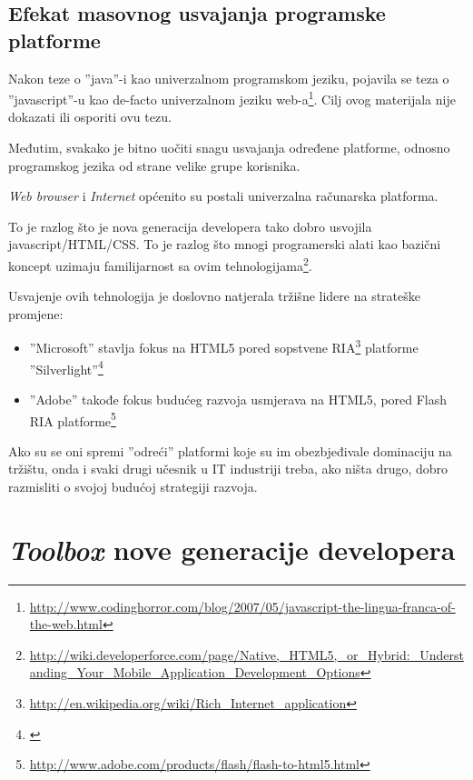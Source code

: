 \documentclass[times, utf8, seminar]{fit}
\begin{document}
\section{Efekat masovnog usvajanja programske platforme}

Nakon teze o ''java''-i kao univerzalnom programskom jeziku, pojavila se teza o ''javascript''-u kao de-facto univerzalnom jeziku web-a\footnote{\url{http://www.codinghorror.com/blog/2007/05/javascript-the-lingua-franca-of-the-web.html}}. Cilj ovog materijala nije dokazati ili osporiti ovu tezu.

Međutim, svakako je bitno uočiti snagu usvajanja određene platforme, odnosno programskog jezika od strane velike grupe korisnika. 

\emph{Web browser} i \emph{Internet} općenito su postali univerzalna računarska platforma. 

To je razlog što je nova generacija developera tako dobro usvojila javascript/HTML/CSS. To je razlog što mnogi programerski alati kao bazični koncept uzimaju familijarnost sa ovim tehnologijama\footnote{\url{http://wiki.developerforce.com/page/Native,_HTML5,_or_Hybrid:_Understanding_Your_Mobile_Application_Development_Options}}.

Usvajenje ovih tehnologija je doslovno natjerala tržišne lidere na strateške promjene:
\begin{itemize}
  \item ''Microsoft'' stavlja fokus na HTML5 pored sopstvene RIA\footnote{\url{http://en.wikipedia.org/wiki/Rich_Internet_application}} platforme ''Silverlight''\footnote{\href{http://www.technologyreview.com/view/426083/html5-triumphant-silverlight-flash-discontinuing}{\color{blue}{Trijumf HTML5 nad zatvorenim vendorskim tehnologijama}}}
  \item ''Adobe'' takođe fokus budućeg razvoja usmjerava na HTML5, pored Flash RIA platforme\footnote{\url{http://www.adobe.com/products/flash/flash-to-html5.html}}
\end{itemize}

Ako su se oni spremi ''odreći'' platformi koje su im obezbjeđivale dominaciju na tržištu, onda i svaki drugi učesnik u IT industriji treba, ako ništa drugo, dobro razmisliti o svojoj budućoj strategiji razvoja. 

\chapter{\emph{Toolbox} nove generacije developera}
\end{document}
